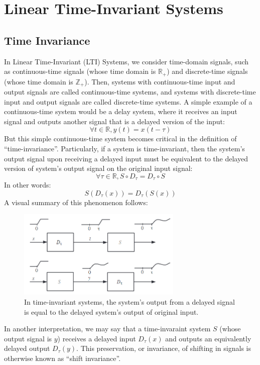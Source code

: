 \chapter{Linear Time-Invariant Systems}

\section{Time Invariance}
In Linear Time-Invariant (LTI) Systems, we consider time-domain signals, such as continuous-time signals (whose time domain is $\mathbb{R}_+$) and discrete-time signals (whose time domain is $\mathbb{Z}_+$).
Then, systems with continuous-time input and output signals are called continuous-time systems, and systems with discrete-time input and output signals are called discrete-time systems.
A simple example of a continuous-time system would be a delay system, where it receives an input signal and outputs another signal that is a delayed version of the input:
\[
    \forall t \in \mathbb{R}, y(t) = x(t - \tau)
\]
But this simple continuous-time system becomes critical in the definition of ``time-invariance''.
Particularly, if a system is time-invariant, then the system's output signal upon receiving a delayed input must be equivalent to the delayed version of system's output signal on the original input signal:
\[
    \forall \tau \in \mathbb{R}, S \circ D_\tau = D_\tau \circ S
\]
In other words:
\[
    S(D_\tau (x)) = D_\tau (S(x))
\]
A visual summary of this phenomenon follows:
\begin{center}
    \begin{figure}[h]
        \centering
        \includegraphics[width=0.7\textwidth]{figs/ln13/time-invariant.png}
        \caption{In time-invariant systems, the system's output from a delayed signal is equal to the delayed system's output of original input.}
    \end{figure}
\end{center}
In another interpretation, we may say that a time-invaraint system $S$ (whose output signal is $y$) receives a delayed input $D_\tau (x)$ and outputs an equivalently delayed output $D_\tau(y)$.
This preservation, or invariance, of shifting in signals is otherwise known as ``shift invariance''.

